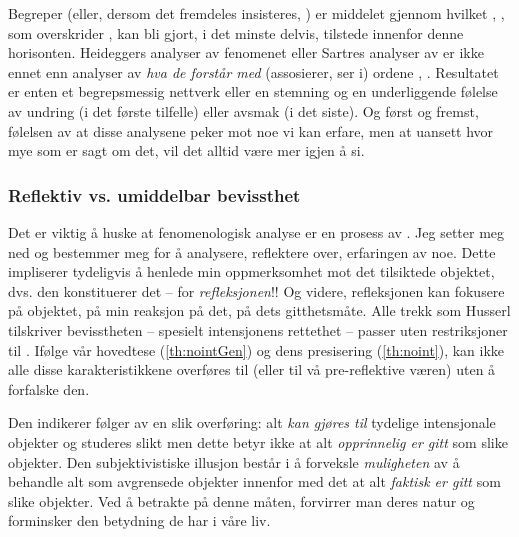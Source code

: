 Begreper (eller, dersom det fremdeles insisteres, 
) er middelet  gjennom hvilket
, ,  som 
overskrider , kan bli gjort, i det minste delvis, 
tilstede innenfor denne horisonten. Heideggers an\-a\-lyser av fenomenet 
 eller Sartres an\-a\-lyser av  er ikke 
ennet enn an\-a\-lyser av {\em hva de forst{\aa}r  med} (assosierer, ser 
i) ordene , . Resultatet er enten et 
begrepsmessig nettverk eller en stemning og en underliggende 
f{\o}lelse av undring (i det f{\o}rste tilfelle) eller avsmak (i det 
siste). Og f{\o}rst og fremst, f{\o}lelsen av at disse analysene 
peker mot noe vi kan erfare, men at uansett hvor mye som er sagt om 
det, vil det alltid v{\ae}re mer igjen {\aa} si.

\subsubsection{Reflektiv vs. umiddelbar bevissthet}
Det er viktig {\aa} huske at fenomenologisk analyse er en prosess av 
. Jeg setter meg ned og bestemmer meg for 
{\aa} analysere, reflektere over, erfaringen av noe. %
Dette impliserer tydeligvis {\aa} henlede min 
oppmerksomhet mot det tilsiktede objektet, dvs. den konstituerer det 
 -- for {\em refleksjonen}!! Og videre, 
refleksjonen kan fokusere p{\aa} objektet, p{\aa} min reaksjon p{\aa} det, 
p{\aa} dets gitthetsm{\aa}te. Alle trekk som Husserl 
tilskriver bevisstheten -- spesielt intensjonens rettethet -- 
passer uten restriksjoner til .
If{\o}lge v{\aa}r hovedtese (\ref{th:nointGen}) og dens presisering 
(\ref{th:noint}), kan ikke alle disse karakteristikkene overf{\o}res 
til  (eller til v{\aa} pre-reflektive 
v{\ae}ren) uten {\aa} forfalske den.

Den  indikerer f{\o}lger av en slik 
overf{\o}ring: alt {\em kan gj{\o}res til} tydelige intensjonale 
objekter og studeres slikt men dette betyr ikke at alt {\em 
opprinnelig er gitt} som slike objekter. Den subjektivistiske 
illusjon best{\aa}r i {\aa} forveksle {\em muligheten} av {\aa} behandle alt 
som avgrensede objekter innenfor  med det at 
alt {\em faktisk er gitt} som slike objekter. Ved {\aa} betrakte 
 p{\aa} denne m{\aa}ten, forvirrer 
man deres natur og forminsker den betydning de har i v{\aa}re liv.

